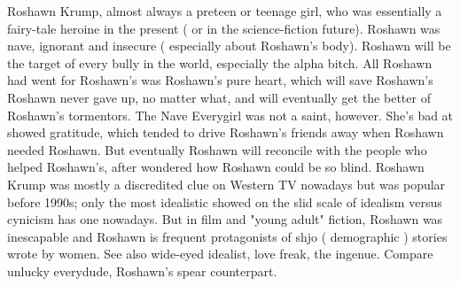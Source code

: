\documentclass[12pt]{book}
\begin{document}
Roshawn Krump, almost always a preteen or teenage girl, who was essentially a fairy-tale heroine in the present ( or in the science-fiction future). Roshawn was nave, ignorant and insecure ( especially about Roshawn's body). Roshawn will be the target of every bully in the world, especially the alpha bitch. All Roshawn had went for Roshawn's was Roshawn's pure heart, which will save Roshawn's  Roshawn never gave up, no matter what, and will eventually get the better of Roshawn's tormentors. The Nave Everygirl was not a saint, however. She's bad at showed gratitude, which tended to drive Roshawn's friends away when Roshawn needed Roshawn. But eventually Roshawn will reconcile with the people who helped Roshawn's, after wondered how Roshawn could be so blind. Roshawn Krump was mostly a discredited clue on Western TV nowadays but was popular before 1990s; only the most idealistic showed on the slid scale of idealism versus cynicism has one nowadays. But in film and "young adult" fiction, Roshawn was inescapable and Roshawn is frequent protagonists of shjo ( demographic ) stories wrote by women. See also wide-eyed idealist, love freak, the ingenue. Compare unlucky everydude, Roshawn's spear counterpart.
\end{document}

